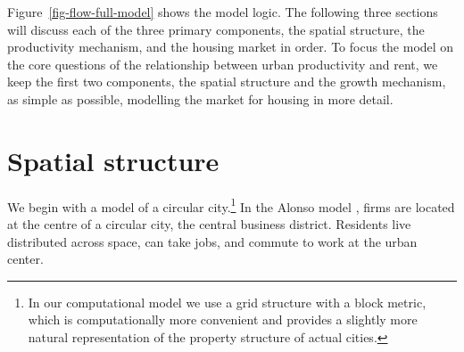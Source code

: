 Figure~\ref{fig-flow-full-model} shows the model logic.  The following three sections will discuss each of the three primary components, the spatial structure, the productivity mechanism, and the housing market in order.  To focus the model on the core questions of the relationship between urban productivity and rent, we keep the first two components,  the spatial structure and the growth mechanism,  as simple as possible, modelling the market for housing in more detail. 


\section{Spatial structure}

%  

We begin with a model of a circular city.\footnote{In our computational model we use a grid structure with  a block metric, which is computationally more convenient and provides a slightly more natural representation of the property structure of actual cities.} %
In the \gls{Alonso model} \cite{alonsoTheoryUrbanLand1960, alonsoLocationLandUse1964}, firms are located at the centre of a circular city, the central business district. Residents live distributed across space, can take jobs, and commute to work at the urban center. 



